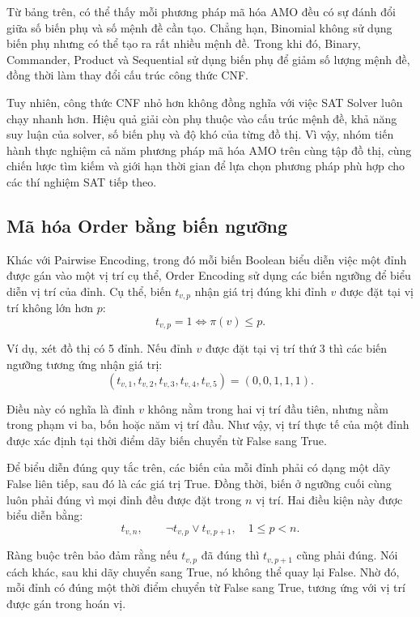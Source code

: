 \documentclass[a4paper,fleqn]{cas-sc}
\begin{document}
Từ bảng trên, có thể thấy mỗi phương pháp mã hóa AMO đều có sự đánh đổi giữa số biến phụ và số mệnh đề cần tạo. Chẳng hạn, Binomial không sử dụng biến phụ nhưng có thể tạo ra rất nhiều mệnh đề. Trong khi đó, Binary, Commander, Product và Sequential sử dụng biến phụ để giảm số lượng mệnh đề, đồng thời làm thay đổi cấu trúc công thức CNF.

Tuy nhiên, công thức CNF nhỏ hơn không đồng nghĩa với việc SAT Solver luôn chạy nhanh hơn. Hiệu quả giải còn phụ thuộc vào cấu trúc mệnh đề, khả năng suy luận của solver, số biến phụ và độ khó của từng đồ thị. Vì vậy, nhóm tiến hành thực nghiệm cả năm phương pháp mã hóa AMO trên cùng tập đồ thị, cùng chiến lược tìm kiếm và giới hạn thời gian để lựa chọn phương pháp phù hợp cho các thí nghiệm SAT tiếp theo.



\subsection{Mã hóa Order bằng biến ngưỡng}

Khác với Pairwise Encoding, trong đó mỗi biến Boolean biểu diễn việc một đỉnh được gán vào một vị trí cụ thể, Order Encoding sử dụng các biến ngưỡng để biểu diễn vị trí của đỉnh. Cụ thể, biến $t_{v,p}$ nhận giá trị đúng khi đỉnh $v$ được đặt tại vị trí không lớn hơn $p$:
\[
t_{v,p}=1 \Longleftrightarrow \pi(v)\leq p.
\]

Ví dụ, xét đồ thị có 5 đỉnh. Nếu đỉnh $v$ được đặt tại vị trí thứ 3 thì các biến ngưỡng tương ứng nhận giá trị:
\[
(t_{v,1},t_{v,2},t_{v,3},t_{v,4},t_{v,5})=(0,0,1,1,1).
\]

Điều này có nghĩa là đỉnh $v$ không nằm trong hai vị trí đầu tiên, nhưng nằm trong phạm vi ba, bốn hoặc năm vị trí đầu. Như vậy, vị trí thực tế của một đỉnh được xác định tại thời điểm dãy biến chuyển từ False sang True.

Để biểu diễn đúng quy tắc trên, các biến của mỗi đỉnh phải có dạng một dãy False liên tiếp, sau đó là các giá trị True. Đồng thời, biến ở ngưỡng cuối cùng luôn phải đúng vì mọi đỉnh đều được đặt trong $n$ vị trí. Hai điều kiện này được biểu diễn bằng:
\begin{equation}
t_{v,n},\qquad \neg t_{v,p}\lor t_{v,p+1},\quad 1\leq p<n.
\label{eq:order-mono}
\end{equation}

Ràng buộc trên bảo đảm rằng nếu $t_{v,p}$ đã đúng thì $t_{v,p+1}$ cũng phải đúng. Nói cách khác, sau khi dãy chuyển sang True, nó không thể quay lại False. Nhờ đó, mỗi đỉnh có đúng một thời điểm chuyển từ False sang True, tương ứng với vị trí được gán trong hoán vị.
\end{document}

